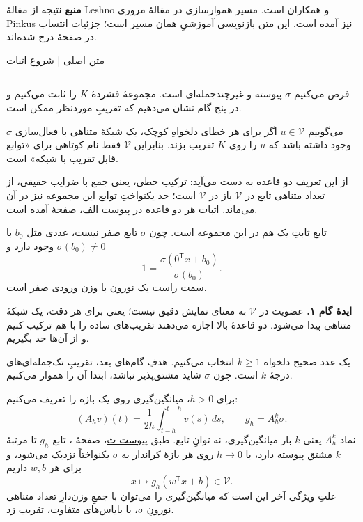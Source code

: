 \documentclass[12pt,a4paper]{article}
\newcommand{\V}{\mathcal V}
\newcommand{\heading}[1]{\par\Needspace{5\baselineskip}\vspace{5pt}{\large\bfseries #1\par}\nobreak\vspace{2pt}}
\newcommand{\subhead}[1]{\par\Needspace{3\baselineskip}\textbf{#1}\quad}
\newcommand{\ribbon}[1]{{\small #1\par}\vspace{-3pt}\hrule\vspace{8pt}}
\newcommand{\appref}[2]{\hyperref[#1]{پیوست #2}، صفحهٔ \pageref{#1}}
\begin{document}
\subhead{منبع}
نتیجه از مقالهٔ Leshno و همکاران \cite{leshno1993} است. مسیر هموارسازی در مقالهٔ مروری Pinkus \cite{pinkus1999} نیز آمده است. این متن بازنویسی آموزشیِ همان مسیر است؛ جزئیات انتساب در صفحهٔ \pageref{sec:references} درج شده‌اند.

\clearpage
{}\label{main:start}\label{step:one}
\ribbon{متن اصلی | شروع اثبات}
\heading{جهت اول: فعال‌سازی غیرچندجمله‌ای کافی است}
فرض می‌کنیم $\sigma$ پیوسته و غیرچندجمله‌ای است. مجموعهٔ فشردهٔ $K$ را ثابت می‌کنیم و در پنج گام نشان می‌دهیم که تقریبِ موردنظر ممکن است.

\heading{گام ۱. توابع قابل تقریب را مشخص می‌کنیم}
می‌گوییم $u\in\V$ اگر برای هر خطای دلخواهِ کوچک، یک شبکهٔ متناهی با فعال‌سازی $\sigma$ وجود داشته باشد که $u$ را روی $K$ تقریب بزند. بنابراین $\V$ فقط نام کوتاهی برای «توابع قابل تقریب با شبکه» است.

از این تعریف دو قاعده به دست می‌آید: ترکیب خطی، یعنی جمع با ضرایب حقیقی، از تعداد متناهی تابع در $\V$ باز در $\V$ است؛ حد یکنواختِ توابع این مجموعه نیز در آن می‌ماند. اثبات هر دو قاعده در \appref{app:approx}{الف} آمده است.

تابع ثابتِ یک هم در این مجموعه است. چون $\sigma$ تابع صفر نیست، عددی مثل $b_0$ با $\sigma(b_0)\neq0$ وجود دارد و
\[
1=\frac{\sigma(0^{\mathsf T}x+b_0)}{\sigma(b_0)}.
\]
سمت راست یک نورون با وزن ورودی صفر است.

\begin{intuition}
\textbf{ایدهٔ گام ۱.} عضویت در $\V$ به معنای نمایش دقیق نیست؛ یعنی برای هر دقت، یک شبکهٔ متناهی پیدا می‌شود. دو قاعدهٔ بالا اجازه می‌دهند تقریب‌های ساده را با هم ترکیب کنیم و از آن‌ها حد بگیریم.
\end{intuition}

\label{step:two}
\heading{گام ۲. مشتق‌های موردنیاز را فراهم می‌کنیم}
یک عدد صحیح دلخواه $k\geq1$ انتخاب می‌کنیم. هدفِ گام‌های بعد، تقریبِ تک‌جمله‌ای‌های درجهٔ $k$ است. چون $\sigma$ شاید مشتق‌پذیر نباشد، ابتدا آن را هموار می‌کنیم.

برای $h>0$، میانگین‌گیری روی یک بازه را تعریف می‌کنیم:
\[
(A_hv)(t)=\frac{1}{2h}\int_{t-h}^{t+h}v(s)\,ds,
\qquad g_h=A_h^k\sigma.
\]
نماد $A_h^k$ یعنی $k$ بار میانگین‌گیری، نه توانِ تابع. طبق \appref{app:smoothing}{ث}، تابع $g_h$ تا مرتبهٔ $k$ مشتق پیوسته دارد، با $h\to0$ روی هر بازهٔ کراندار به $\sigma$ یکنواختاً نزدیک می‌شود، و برای هر $w,b$ داریم
\[
x\longmapsto g_h(w^{\mathsf T}x+b)\in\V.
\]
علتِ ویژگی آخر این است که میانگین‌گیری را می‌توان با جمعِ وزن‌دارِ تعداد متناهی نورونِ $\sigma$، با بایاس‌های متفاوت، تقریب زد.
\end{document}
